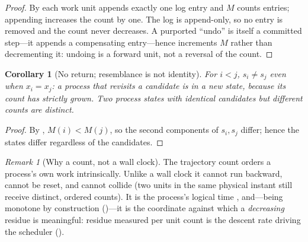 \documentclass[twocolumn,10pt,a4paper]{article}
\theoremstyle{thmstyle}
\newtheorem{corollary}[theorem]{Corollary}
\theoremstyle{definition}
\theoremstyle{remark}
\newtheorem{remark}[theorem]{Remark}
\newcommand{\Mcount}{M}
\begin{document}
\begin{proof}
By  each work unit appends exactly one log entry and
$\Mcount$ counts entries; appending increases the count by one. The log
is append-only, so no entry is removed and the count never decreases. A
purported ``undo'' is itself a committed step---it appends a
compensating entry---hence increments $\Mcount$ rather than decrementing
it: undoing is a forward unit, not a reversal of the count.
\end{proof}

\begin{corollary}[No return; resemblance is not identity]
\label{cor:noreturn}
For $i<j$, $s_i\neq s_j$ even when $x_i=x_j$: a process that revisits a
candidate is in a new state, because its count has strictly grown. Two
process states with identical candidates but different counts are
distinct.
\end{corollary}

\begin{proof}
By , $\Mcount(i)<\Mcount(j)$, so the second components
of $s_i,s_j$ differ; hence the states differ regardless of the
candidates.
\end{proof}

\begin{remark}[Why a count, not a wall clock]
\label{rem:why-count}
The trajectory count orders a process's own work intrinsically. Unlike a
wall clock it cannot run backward, cannot be reset, and cannot collide
(two units in the same physical instant still receive distinct, ordered
counts). It is the process's logical time
\citep{lamport1978,fidge1988,mattern1989}, and---being monotone by
construction ()---it is the coordinate against which a
\emph{decreasing} residue is meaningful: residue measured per unit count
is the descent rate driving the scheduler ().
\end{remark}
\end{document}
